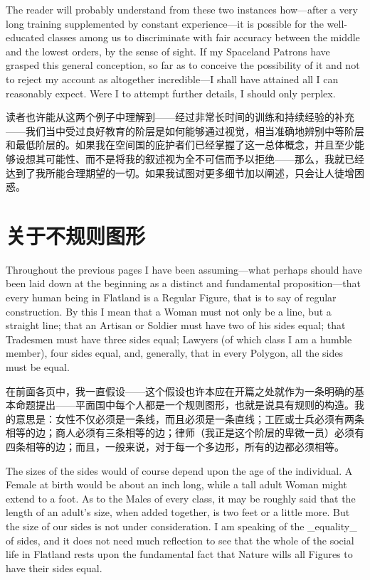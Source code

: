 \documentclass[12pt,UTF8]{ctexbook}
\begin{document}
The reader will probably understand from these two instances how---after a very long training supplemented by constant experience---it is possible for the well-educated classes among us to discriminate with fair accuracy between the middle and the lowest orders, by the sense of sight. If my Spaceland Patrons have grasped this general conception, so far as to conceive the possibility of it and not to reject my account as altogether incredible---I shall have attained all I can reasonably expect. Were I to attempt further details, I should only perplex.

读者也许能从这两个例子中理解到——经过非常长时间的训练和持续经验的补充——我们当中受过良好教育的阶层是如何能够通过视觉，相当准确地辨别中等阶层和最低阶层的。如果我在空间国的庇护者们已经掌握了这一总体概念，并且至少能够设想其可能性、而不是将我的叙述视为全不可信而予以拒绝——那么，我就已经达到了我所能合理期望的一切。如果我试图对更多细节加以阐述，只会让人徒增困惑。

\chapter{关于不规则图形}

Throughout the previous pages I have been assuming---what perhaps should have been laid down at the beginning as a distinct and fundamental proposition---that every human being in Flatland is a Regular Figure, that is to say of regular construction. By this I mean that a Woman must not only be a line, but a straight line; that an Artisan or Soldier must have two of his sides equal; that Tradesmen must have three sides equal; Lawyers (of which class I am a humble member), four sides equal, and, generally, that in every Polygon, all the sides must be equal.

在前面各页中，我一直假设——这个假设也许本应在开篇之处就作为一条明确的基本命题提出——平面国中每个人都是一个规则图形，也就是说具有规则的构造。我的意思是：女性不仅必须是一条线，而且必须是一条直线；工匠或士兵必须有两条相等的边；商人必须有三条相等的边；律师（我正是这个阶层的卑微一员）必须有四条相等的边；而且，一般来说，对于每一个多边形，所有的边都必须相等。

The sizes of the sides would of course depend upon the age of the individual. A Female at birth would be about an inch long, while a tall adult Woman might extend to a foot. As to the Males of every class, it may be roughly said that the length of an adult's size, when added together, is two feet or a little more. But the size of our sides is not under consideration. I am speaking of the \_equality\_ of sides, and it does not need much reflection to see that the whole of the social life in Flatland rests upon the fundamental fact that Nature wills all Figures to have their sides equal.
\end{document}
